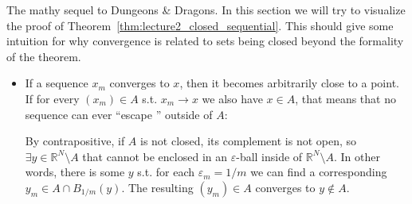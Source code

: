 \documentclass{article}
\theoremstyle{definition}
\begin{document}
The mathy sequel to Dungeons \& Dragons. In this section we will try to visualize the proof of Theorem~\ref{thm:lecture2_closed_sequential}. This should give some intuition for why convergence is related to sets being closed beyond the formality of the theorem.
\begin{itemize}
  \item If a sequence $x_m$ converges to $x$, then it becomes arbitrarily close to a point. If for every $(x_m) \in A$ s.t. $x_m \to x$ we also have $x \in A$, that means that no sequence can ever ``escape '' outside of $A$:
    \begin{figure}[H]
      \centering
    \end{figure}

    By contrapositive, if $A$ is not closed, its complement is not open, so $\exists y \in \mathbb{R}^N \setminus A$ that cannot be enclosed in an $\varepsilon$-ball inside of $\mathbb{R}^N \setminus A$. In other words, there is some $y$ s.t. for each $\varepsilon_m = 1/m$ we can find a corresponding $y_m \in A \cap B_{1/m}(y)$. The resulting $(y_m) \in A$ converges to $y \notin A$.
    \begin{figure}[H]
      \centering
\end{figure}
\end{itemize}
\end{document}
